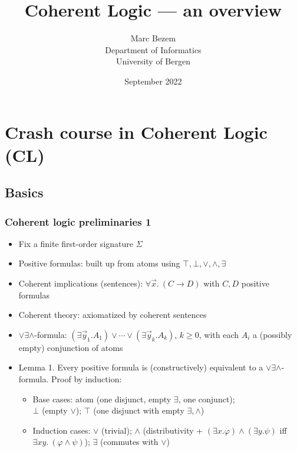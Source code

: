 \documentclass[handout,11pt]{beamer}
\title{Coherent Logic --- an overview}
\author{Marc Bezem\\
Department of Informatics\\
University of Bergen
}
\date{September 2022}
\newcommand{\deca}{${\lor}{\exists}{\land}$}
\begin{document}
\frame{\titlepage}

\section[Outline]{}
\frame{\tableofcontents}


\section{Crash course in Coherent Logic (CL)}

\subsection{Basics}

\begin{frame}
\frametitle{Coherent logic preliminaries 1}
 \begin{itemize}[<+->]   %
    \item Fix a finite first-order signature $\Sigma$
    \item Positive formulas: built up from atoms using 
    $\top,\bot,\lor,\land,\exists$
    \item Coherent implications (sentences): $\forall\vec{x}.~(C \to D)$ 
    with $C,D$ positive formulas
    \item Coherent theory: axiomatized by coherent sentences
    \item \deca-formula: 
    $(\exists\vec{y}_1.A_1) \lor \cdots \lor (\exists\vec{y}_k.A_k)$,
    $k\geq 0$, with each $A_i$ a (possibly empty) conjunction of atoms
    \item Lemma 1. Every positive formula is (constructively) equivalent to
    a \deca-formula. Proof by induction:
    \begin{itemize}[<+->]   %
    \item Base cases: atom (one disjunct, empty $\exists$, one conjunct);\\ 
    $\bot$ (empty $\lor$); 
    $\top$ (one disjunct with empty $\exists,\land$)
    \item Induction cases: $\lor$ (trivial); 
    $\land$ (distributivity + $(\exists x.\varphi) \land (\exists y.\psi)$ iff 
                              $\exists xy.~(\varphi\land\psi)$);
    $\exists$ (commutes with $\vee$)    
    \end{itemize}
 \end{itemize}
\end{frame}
\end{document}
